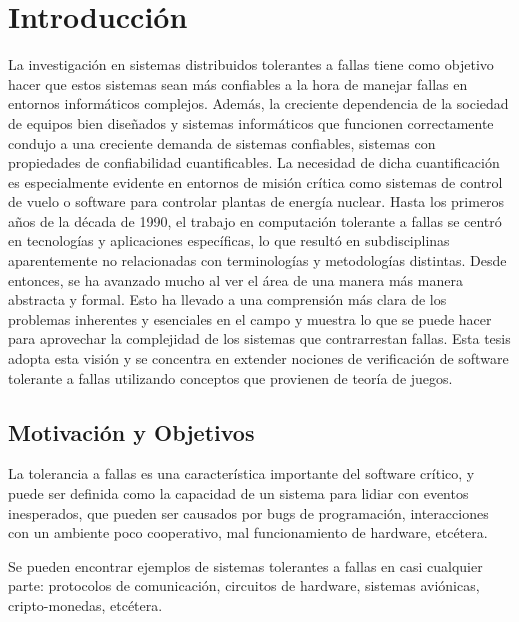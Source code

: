 \chapter{Introducci\'on}
\label{cap:introduccion}

La investigación en sistemas distribuidos tolerantes a fallas tiene como objetivo hacer que estos sistemas sean más confiables a la hora de manejar fallas en entornos informáticos complejos. Además, la creciente dependencia de la sociedad de equipos bien diseñados y sistemas informáticos que funcionen correctamente
condujo a una creciente demanda de sistemas confiables, sistemas con propiedades de confiabilidad cuantificables. La necesidad de
dicha cuantificación es especialmente evidente en entornos de misión crítica como sistemas de control de vuelo o software para controlar plantas de energía nuclear. Hasta los primeros años de la década de 1990, el trabajo en computación tolerante a fallas
se centró en tecnologías y aplicaciones específicas, lo que resultó en subdisciplinas aparentemente no relacionadas con terminologías y metodologías distintas.
Desde entonces, se ha avanzado mucho al ver el área de una manera más
manera abstracta y formal. Esto ha llevado a
una comprensión más clara de los problemas inherentes y esenciales en el campo y
muestra lo que se puede hacer para aprovechar la
complejidad de los sistemas que contrarrestan
fallas. Esta tesis adopta esta visión y se concentra en extender nociones de verificación de software tolerante a fallas utilizando conceptos que provienen de teoría de juegos.

\section{Motivaci\'on y Objetivos}
\label{sec:intro.objetivos}

La tolerancia a fallas es una característica importante del software crítico, y puede ser definida como la capacidad de un sistema para lidiar con eventos inesperados, que pueden ser causados por bugs de programación, interacciones con un ambiente poco cooperativo, mal funcionamiento de hardware, etcétera.

Se pueden encontrar ejemplos de sistemas tolerantes a fallas en casi cualquier parte: protocolos de comunicación, circuitos de hardware, sistemas aviónicas, cripto-monedas, etcétera.

